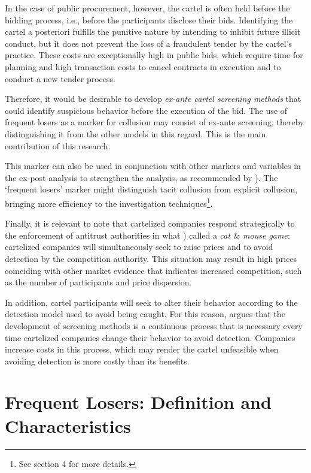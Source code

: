 \documentclass[10pt]{article}
\begin{document}
 In the case of public procurement, however, the cartel is often held before the bidding process, i.e., before the participants disclose their bids. Identifying the cartel a posteriori fulfills the punitive nature by intending to inhibit future illicit conduct, but it does not prevent the loss of a fraudulent tender by the cartel’s practice. These costs are exceptionally high in public bids, which require time for planning and high transaction costs to cancel contracts in execution and to conduct a new tender process.

Therefore, it would be desirable to develop \textit{ex-ante cartel screening methods} that could identify suspicious behavior before the execution of the bid. The use of frequent losers as a marker for collusion may consist of ex-ante screening, thereby distinguishing it from the other models in this regard. This is the main contribution of this research.

This marker can also be used in conjunction with other markers and variables in the ex-post analysis to strengthen the analysis, as recommended by  \cite{harrington2008detecting}). The ‘frequent losers’ marker might distinguish tacit collusion from explicit collusion, bringing more efficiency to the investigation techniques\footnote{ See section 4 for more details.}.

 Finally, it is relevant to note that cartelized companies respond strategically to the enforcement of antitrust authorities in what  \cite{schinkel2013balancing}) called a \textit{cat $\&$ mouse game}: cartelized companies will simultaneously seek to raise prices and to avoid detection by the competition authority. This situation may result in high prices coinciding with other market evidence that indicates increased competition, such as the number of participants and price dispersion.

 In addition, cartel participants will seek to alter their behavior according to the detection model used to avoid being caught. For this reason,  \cite{schinkel2013balancing} argues that the development of screening methods is a continuous process that is necessary every time cartelized companies change their behavior to avoid detection. Companies increase costs in this process, which may render the cartel unfeasible when avoiding detection is more costly than its benefits.

\vspace{1\baselineskip}
\section{Frequent Losers: Definition and Characteristics}
\end{document}
